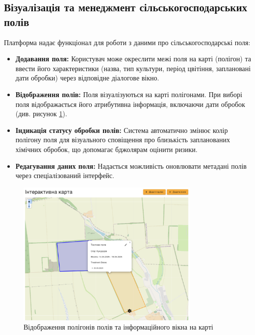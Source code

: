 
\subsection{Візуалізація та менеджмент сільськогосподарських полів}
\label{subsec:task_map_fields}
Платформа надає функціонал для роботи з даними про сільськогосподарські поля:
\begin{itemize}
    \item \textbf{Додавання поля:} Користувач може окреслити межі поля на карті (полігон) та ввести його характеристики (назва, тип культури, період цвітіння, заплановані дати обробки) через відповідне діалогове вікно.
    \item \textbf{Відображення полів:} Поля візуалізуються на карті полігонами. При виборі поля відображається його атрибутивна інформація, включаючи дати обробок (див. рисунок \ref{fig:task_map_fields_demo}).
    \item \textbf{Індикація статусу обробки полів:} Система автоматично змінює колір полігону поля для візуального сповіщення про близькість запланованих хімічних обробок, що допомагає бджолярам оцінити ризики.
    \item \textbf{Редагування даних поля:} Надається можливість оновлювати метадані полів через спеціалізований інтерфейс.
\end{itemize}

\begin{figure}[htbp]
    \centering
    \includegraphics[width=0.8\textwidth]{practice_report/images/map_fields_demo.png}
    \caption{Відображення полігонів полів та інформаційного вікна на карті}
    \label{fig:task_map_fields_demo}
\end{figure}


